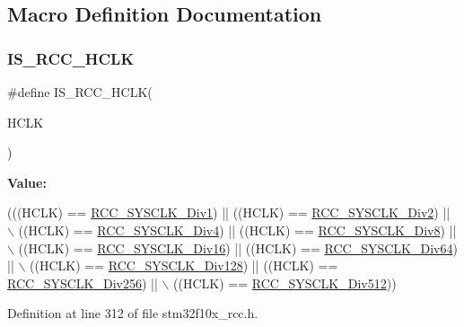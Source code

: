\subsection{Macro Definition Documentation}
\mbox{\label{group___a_h_b__clock__source_ga6e9f1c193a2f41bcb3c2f7fa8459b5b3}} 
\subsubsection{\texorpdfstring{I\+S\+\_\+\+R\+C\+C\+\_\+\+H\+C\+LK}{IS\_RCC\_HCLK}}
{\footnotesize\ttfamily \#define I\+S\+\_\+\+R\+C\+C\+\_\+\+H\+C\+LK(\begin{DoxyParamCaption}\item[{}]{H\+C\+LK }\end{DoxyParamCaption})}

{\bfseries Value\+:}
\begin{DoxyCode}
(((HCLK) == \hyperlink{group___a_h_b__clock__source_gadc3ac37d90c2082d640e5948fac0878f}{RCC\_SYSCLK\_Div1}) || ((HCLK) == \hyperlink{group___a_h_b__clock__source_gacadd82156776154a07d128b454fc69fd}{RCC\_SYSCLK\_Div2}) || \(\backslash\)
                           ((HCLK) == \hyperlink{group___a_h_b__clock__source_ga458f8ae63164e878930dbebd7643f087}{RCC\_SYSCLK\_Div4}) || ((HCLK) == 
      \hyperlink{group___a_h_b__clock__source_gade72fe3aca89f3e8c4fe8692ea217912}{RCC\_SYSCLK\_Div8}) || \(\backslash\)
                           ((HCLK) == \hyperlink{group___a_h_b__clock__source_gaefd8df4be9c9dbd9cebfb2384933500a}{RCC\_SYSCLK\_Div16}) || ((HCLK) == 
      \hyperlink{group___a_h_b__clock__source_gab6a2c2d4e945c607259988a9b6df26e5}{RCC\_SYSCLK\_Div64}) || \(\backslash\)
                           ((HCLK) == \hyperlink{group___a_h_b__clock__source_ga1a28926fcb86112058a365e01fe9a46b}{RCC\_SYSCLK\_Div128}) || ((HCLK) == 
      \hyperlink{group___a_h_b__clock__source_gaa28bb876893b3267a813fc98a462d5ee}{RCC\_SYSCLK\_Div256}) || \(\backslash\)
                           ((HCLK) == \hyperlink{group___a_h_b__clock__source_gab5b4588c455d6327bc96f131ed6698ab}{RCC\_SYSCLK\_Div512}))
\end{DoxyCode}


Definition at line 312 of file stm32f10x\+\_\+rcc.\+h.

